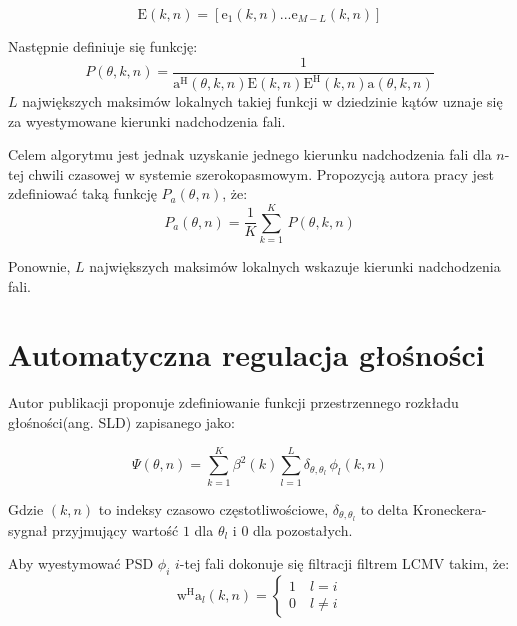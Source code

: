 \begin{equation}
    \label{equation:eigenvectors}
    \bm{\mathrm{E}}(k,n)=
    [\bm{\mathrm{e}}_{1}(k,n)...
    \bm{\mathrm{e}}_{M-L}(k,n)]
\end{equation}

\noindent Następnie definiuje się funkcję:
\begin{equation}
    \label{equation:P}
    P(\theta,k,n)=
    \dfrac{1}{
    \bm{\mathrm{a}}^{\mathrm{H}}(\theta,k,n)
    \bm{\mathrm{E}}(k,n)
    \bm{\mathrm{E}}^{\mathrm{H}}(k,n)
    \bm{\mathrm{a}}(\theta,k,n)
    }
\end{equation}
\noindent 
$L$ największych maksimów lokalnych takiej funkcji w dziedzinie kątów uznaje się za wyestymowane kierunki nadchodzenia fali.

\noindent Celem algorytmu jest jednak uzyskanie jednego kierunku nadchodzenia fali dla $n$-tej chwili czasowej w systemie szerokopasmowym. Propozycją autora pracy jest zdefiniować taką funkcję $P_{a}(\theta,n)$, że:
\begin{equation}
    \label{equation:Pa}
    P_{a}(\theta,n) = 
    \dfrac{1}{K}\sum_{k=1}^{K}\,P(\theta,k,n)   
\end{equation}

\noindent Ponownie, $L$ największych maksimów lokalnych wskazuje kierunki nadchodzenia fali.

\newpage
\section{Automatyczna regulacja głośności}

Autor publikacji \cite{Braun2014} proponuje zdefiniowanie funkcji przestrzennego rozkładu głośności(ang. SLD) zapisanego jako:

\begin{equation}
    \label{equation:SLD}
    \Psi(\theta,n)=
    \sum_{k=1}^{K} \beta^{2}(k)
    \sum_{l=1}^{L}\delta_{\theta,\theta_{l}}
    \, \phi_{l}(k,n)
\end{equation}

\noindent Gdzie $(k,n)$ to indeksy czasowo częstotliwościowe, $\delta_{\theta,\theta_{l}}$ to delta Kroneckera- sygnał przyjmujący wartość $1$ dla $\theta_{l}$ i $0$ dla pozostałych.

\noindent Aby wyestymować PSD $\phi_{i}$ $i$-tej fali dokonuje się filtracji filtrem LCMV takim, że:
\begin{equation}
    \label{equation:power estimation}
    \bm{\mathrm{w}}^{\mathrm{H}}\bm{\mathrm{a}}_{l}(k,n)=
    \begin{cases}
        1 \quad l=i \\
        0 \quad l \neq i
    \end{cases}
\end{equation}


